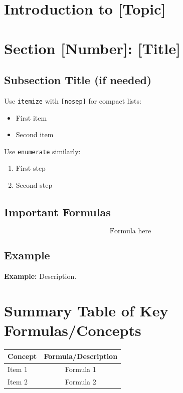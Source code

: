 \documentclass[11pt]{article}
\begin{document}
\section*{Introduction to [Topic]}

\section*{Section [Number]: [Title]}

\subsection*{Subsection Title (if needed)}
Use \verb|itemize| with \verb|[nosep]| for compact lists:
\begin{itemize}[nosep]
    \item First item
    \item Second item
\end{itemize}

Use \verb|enumerate| similarly:
\begin{enumerate}[nosep]
    \item First step
    \item Second step
\end{enumerate}

\subsection*{Important Formulas}
\[
\text{Formula here}
\]

\subsection*{Example}
\textbf{Example:} Description.

\section*{Summary Table of Key Formulas/Concepts}
{\small
\begin{center}
\begin{tabular}{l c}
\toprule
\textbf{Concept} & \textbf{Formula/Description} \\
\midrule
Item 1 & Formula 1 \\
Item 2 & Formula 2 \\
\bottomrule
\end{tabular}
\end{center}
}
\end{document}
